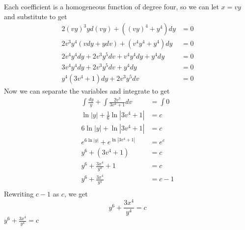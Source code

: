 \documentclass{report}
\begin{document}
\soln Each coefficient is a homogeneous function of degree four, so we can let $x=vy$ and substitute to get
\begin{align*}
    2(vy)^3yd(vy)+((vy)^4+y^4)dy &= 0 \\
    2v^3y^4(vdy+ydv)+(v^4y^4+y^4)dy &= 0 \\
    2v^4y^4dy+2v^3y^5dv+v^4y^4dy+y^4dy &= 0 \\
    3v^4y^4dy+2v^3y^5dv+y^4dy &= 0 \\
    y^4(3v^4+1)dy+2v^3y^5dv &= 0
\end{align*}
Now we can separate the variables and integrate to get
\begin{align*}
    \int \frac{dy}{y} + \int \frac{2v^3}{3v^4+1}dv &= \int 0 \\
    \ln{|y|} + \frac{1}{6}\ln{|3v^4+1|} &= c \\
    6\ln{|y|} + \ln{|3v^4+1|} &= c \\
    e^{6\ln{|y|}}+e^{\ln{|3v^4+1|}} &= e^c \\
    y^6+(3v^4+1) &= c \\
    y^6+\frac{3x^4}{y^4}+1 &= c \\
    y^6+\frac{3x^4}{y^4} &= c-1 \\
\end{align*}
Rewriting $c-1$ as $c$, we get
\[
    y^6+\frac{3x^4}{y^4} = c
\]
\ans $y^6+\frac{3x^4}{y^4} = c$

\medskip


\end{document}
